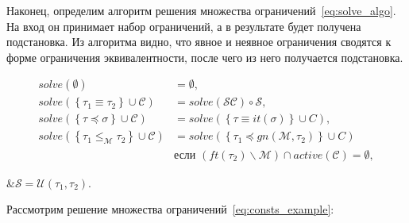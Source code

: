 Наконец, определим алгоритм решения множества ограничений~\eqref{eq:solve_algo}.
На вход он принимает набор ограничений, а в результате будет получена подстановка.
Из алгоритма видно, что явное и неявное ограничения сводятся к форме ограничения эквивалентности, после чего из него получается подстановка.

\begin{equation}
    \label{eq:solve_algo}
    \begin{aligned}
        solve(\emptyset) &= \emptyset, \\
        solve(\left\{ \tau_1 \equiv \tau_2 \right\} \cup \mathcal{C}) &= solve(\mathcal{S} \mathcal{C}) \circ \mathcal{S}, \\
        solve(\left\{ \tau \preceq \sigma \right\} \cup \mathcal{C}) &= solve(\left\{ \tau \equiv it(\sigma) \right\} \cup C), \\
        solve(\left\{ \tau_1 \leq_{\mathcal{M}} \tau_2 \right\} \cup \mathcal{C}) &= solve(\left\{ \tau_1 \preceq gn(\mathcal{M}, \tau_2) \right\} \cup C) \\
        &\text{если } (ft(\tau_2) \backslash \mathcal{M}) \cap active(\mathcal{C}) = \emptyset,
    \end{aligned}
\end{equation}
\begin{eqrem}
    &$\mathcal{S} = \mathcal{U}(\tau_1, \tau_2)$.\\
\end{eqrem}

Рассмотрим решение множества ограничений~\ref{eq:consts_example}:

